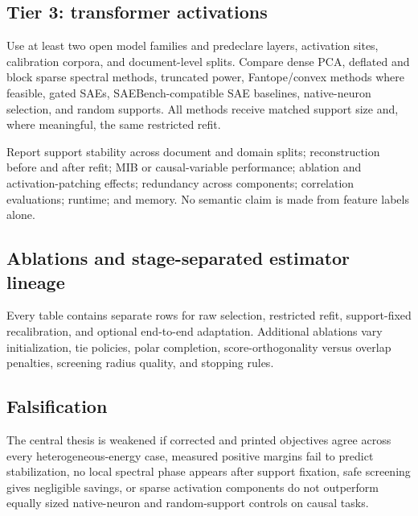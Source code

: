 \subsection{Tier 3: transformer activations}
Use at least two open model families and predeclare layers, activation sites, calibration corpora, and document-level splits. Compare dense PCA, deflated and block sparse spectral methods, truncated power, Fantope/convex methods where feasible, gated SAEs, SAEBench-compatible SAE baselines, native-neuron selection, and random supports. All methods receive matched support size and, where meaningful, the same restricted refit.

Report support stability across document and domain splits; reconstruction before and after refit; MIB or causal-variable performance; ablation and activation-patching effects; redundancy across components; correlation evaluations; runtime; and memory. No semantic claim is made from feature labels alone.

\subsection{Ablations and stage-separated estimator lineage}
Every table contains separate rows for raw selection, restricted refit, support-fixed recalibration, and optional end-to-end adaptation. Additional ablations vary initialization, tie policies, polar completion, score-orthogonality versus overlap penalties, screening radius quality, and stopping rules.

\subsection{Falsification}
The central thesis is weakened if corrected and printed objectives agree across every heterogeneous-energy case, measured positive margins fail to predict stabilization, no local spectral phase appears after support fixation, safe screening gives negligible savings, or sparse activation components do not outperform equally sized native-neuron and random-support controls on causal tasks.
